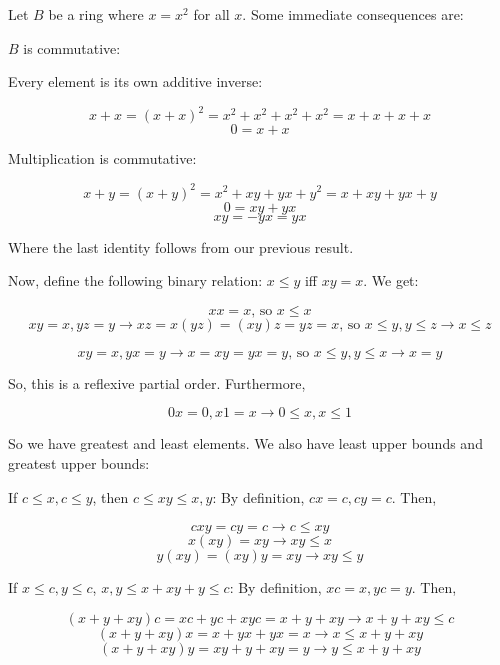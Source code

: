 \documentclass{article}
\title{}
\author{}
\date{}
\begin{document}
  \maketitle
  \section{}

    Let $B$ be a ring where $x = x^2$ for all $x$. Some immediate consequences
    are:

    $B$ is commutative:

    Every element is its own additive inverse:

    \[ x + x = (x + x)^2 = x^2 + x^2 + x^2 + x^2 = x + x + x + x\]
    \[0 = x + x\]

    Multiplication is commutative:

    \[ x + y = (x + y)^2 = x^2 + xy + yx + y^2 = x + xy + yx + y\]
    \[0 = xy + yx\]
    \[xy = -yx = yx\]

    Where the last identity follows from our previous result.

    Now, define the following binary relation: $x \leq y$ iff $xy = x$. We get:

    \[xx = x \text{, so } x \leq x\]
    \[xy = x, yz = y \rightarrow xz = x(yz) = (xy)z = yz = x \text{, so } x
    \leq y, y \leq z \rightarrow x \leq z\]

    \[xy = x, yx = y \rightarrow x = xy = yx = y \text{, so } x \leq y, y \leq
    x \rightarrow x = y\]

    So, this is a reflexive partial order. Furthermore,

    \[0x = 0, x1 = x \rightarrow 0 \leq x, x \leq 1\]

    So we have greatest and least elements. We also have least upper bounds and
    greatest upper bounds:

    If $c \leq x, c \leq y$, then $c \leq xy \leq x, y$: By definition,
    $cx = c, cy = c$. Then,

    \[ cxy = cy = c \rightarrow c \leq xy\]
    \[ x(xy) = xy \rightarrow xy \leq x\]
    \[ y(xy) = (xy)y = xy \rightarrow xy \leq y\]


    If $x \leq c, y \leq c$, $x, y \leq x + xy + y \leq c$: By definition,
    $xc = x, yc = y$. Then,

    \[(x + y + xy)c = xc + yc + xyc = x + y + xy \rightarrow x + y + xy \leq c\]
    \[(x + y + xy)x = x + yx + yx = x \rightarrow x \leq x + y + xy\]
    \[(x + y + xy)y = xy + y + xy = y \rightarrow y \leq x + y + xy\]
\end{document}
